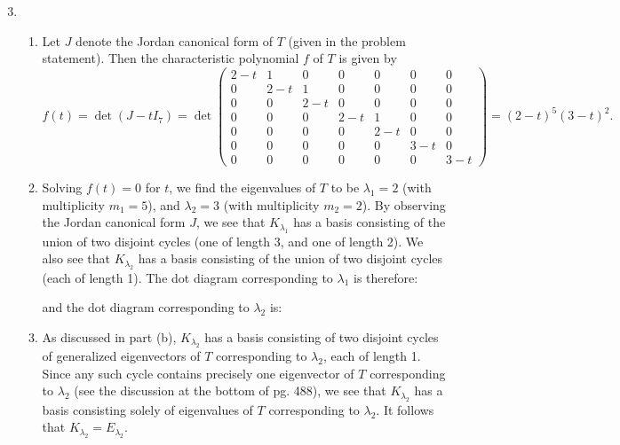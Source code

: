 \documentclass[12pt]{article}
\begin{document}
\begin{enumerate}
\setcounter{enumi}{2}
\item
\begin{enumerate}
\item
Let $J$ denote the Jordan canonical form of $T$ (given in the problem statement). Then the characteristic polynomial $f$ of $T$ is given by
\begin{equation*}
f(t) = \det(J - tI_7) = \det\begin{pmatrix}
2 - t & 1 & 0 & 0 & 0 & 0 & 0 \\
0 & 2 - t & 1 & 0 & 0 & 0 & 0 \\
0 & 0 & 2 - t & 0 & 0 & 0 & 0 \\
0 & 0 & 0 & 2 - t & 1 & 0 & 0 \\
0 & 0 & 0 & 0 & 2 - t & 0 & 0 \\
0 & 0 & 0 & 0 & 0 & 3 - t & 0 \\
0 & 0 & 0 & 0 & 0 & 0 & 3 - t
\end{pmatrix} = (2 - t)^5(3 - t)^2.
\end{equation*}

\item
Solving $f(t) = 0$ for $t$, we find the eigenvalues of $T$ to be $\lambda_1 = 2$ (with multiplicity $m_1 = 5$), and $\lambda_2 = 3$ (with multiplicity $m_2 = 2$). By observing the Jordan canonical form $J$, we see that $K_{\lambda_1}$ has a basis consisting of the union of two disjoint cycles (one of length 3, and one of length 2). We also see that $K_{\lambda_2}$ has a basis consisting of the union of two disjoint cycles (each of length 1). The dot diagram corresponding to $\lambda_1$ is therefore:

\medskip
{}

\medskip
\noindent and the dot diagram corresponding to $\lambda_2$ is:

\medskip
{}

\item
As discussed in part (b), $K_{\lambda_2}$ has a basis consisting of two disjoint cycles of generalized eigenvectors of $T$ corresponding to $\lambda_2$, each of length 1. Since any such cycle contains precisely one eigenvector of $T$ corresponding to $\lambda_2$ (see the discussion at the bottom of pg. 488), we see that $K_{\lambda_2}$ has a basis consisting solely of eigenvalues of $T$ corresponding to $\lambda_2$. It follows that $K_{\lambda_2} = E_{\lambda_2}$.


\end{enumerate}
\end{enumerate}
\end{document}
